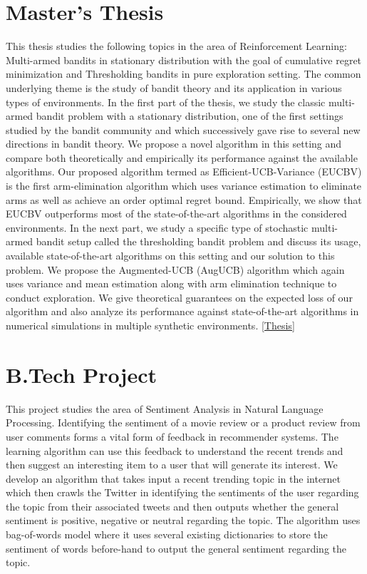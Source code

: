 \documentclass[margin,11pt]{res}
\begin{document}
\begin{resume}






\section{Master's Thesis}

This thesis studies the following topics in the area of Reinforcement Learning: Multi-armed bandits in stationary distribution with the goal of cumulative regret minimization and Thresholding bandits in pure exploration setting. The common underlying theme is the study of bandit theory and its application in various types of environments. In the first part of the thesis, we study the classic multi-armed bandit problem with a stationary distribution, one of the first settings studied by the bandit community and which successively gave rise to several new directions in bandit theory. We propose a novel algorithm in this setting and compare both theoretically and empirically its performance against the available algorithms. Our proposed algorithm termed as Efficient-UCB-Variance (EUCBV) is the first arm-elimination algorithm which uses variance estimation to eliminate arms as well as achieve an order optimal regret bound. Empirically, we show that EUCBV outperforms most of the state-of-the-art algorithms in the considered environments. In the next part, we study a specific type of stochastic multi-armed bandit setup called the thresholding bandit problem and discuss its usage, available state-of-the-art algorithms on this setting and our solution to this problem. We propose the Augmented-UCB (AugUCB) algorithm which again uses variance and mean estimation along with arm elimination technique to conduct exploration. We give theoretical guarantees on the expected loss of our algorithm and also analyze its performance against state-of-the-art algorithms in numerical simulations in multiple synthetic environments. \href{https://subhojyoti.github.io/pdf/final_thesis(A5)_Subhojyoti_CS15S300.pdf}{[Thesis]}


\section{B.Tech Project}

This project studies the area of Sentiment Analysis in Natural Language Processing. Identifying the sentiment of a movie review or a product review from user comments forms a vital form of feedback in recommender systems. The learning algorithm can use this feedback to understand the recent trends and then suggest an interesting item to a user that will generate its interest. We develop an algorithm that takes input a recent trending topic in the internet which then crawls the Twitter in identifying the sentiments of the user regarding the topic from their associated tweets and then outputs whether the general sentiment is positive, negative or neutral regarding the topic. The algorithm uses bag-of-words model where it uses several existing dictionaries to store the sentiment of words before-hand to output the general sentiment regarding the topic.




\end{resume}
\end{document}

